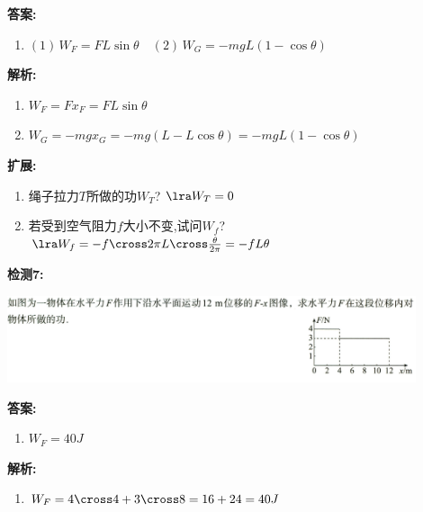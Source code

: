 \documentclass{article}
\begin{document}
\begin{itemize}
\begin{enumerate}
                  \vspace{1em}

                  \textbf{答案:}
                  \begin{enumerate}
                      \item[] $(1)\,W_{F} = FL\sin{\theta} \quad (2)\,W_{G} = -mgL(1-\cos{\theta})$
                  \end{enumerate}

                  \textbf{解析:}
                  \begin{enumerate}[label=(\arabic*)]
                      \item $W_{F} = F x_{F} = F L \sin{\theta} $
                      \item $W_{G} = -mg x_{G} = -mg(L - L \cos{\theta}) = -mgL(1-\cos{\theta})$
                  \end{enumerate}

                  \textbf{扩展:}
                  \begin{enumerate}[label=(\arabic*)]
                      \item 绳子拉力$T$所做的功$W_{T}$? $\lra W_{T} = 0$
                      \item 若受到空气阻力$f$大小不变,试问$W_{f}$? $\lra W_{f} = -f \cross 2\pi L \cross \frac{\theta}{2 \pi} = -fL\theta $
                  \end{enumerate}

                  \vspace{2em}

                  \textbf{检测7:}

                  \includegraphics[width=0.9\textwidth]{pictures/3.png}

                  \vspace{1em}

                  \textbf{答案:}
                  \begin{enumerate}[label=(\arabic*)]
                      \item[] $W_{F} = 40J $
                  \end{enumerate}

                  \textbf{解析:}
                  \begin{enumerate}[label=(\arabic*)]
                      \item[] $W_{F} = 4 \cross 4 + 3 \cross 8 = 16 +24 = 40J $
                  \end{enumerate}


\end{enumerate}
\end{itemize}
\end{document}
